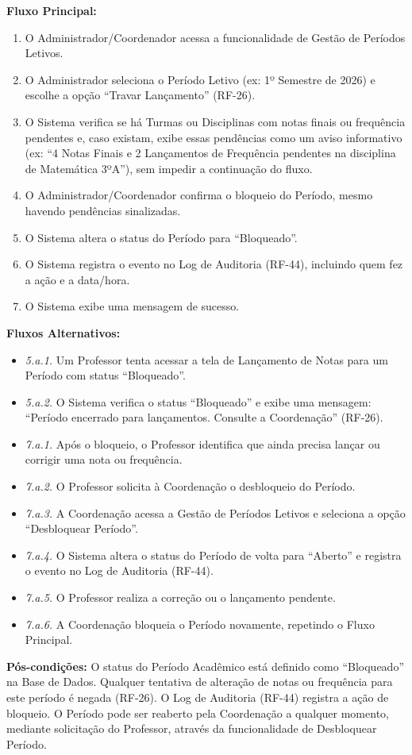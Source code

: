 \textbf{Fluxo Principal:}
\begin{enumerate}[nosep]
    \item O Administrador/Coordenador acessa a funcionalidade de Gestão de Períodos Letivos.
    \item O Administrador seleciona o Período Letivo (ex: 1º Semestre de 2026) e escolhe a opção ``Travar Lançamento'' (RF-26).
    \item O Sistema verifica se há Turmas ou Disciplinas com notas finais ou frequência pendentes e, caso existam, exibe essas pendências como um aviso informativo (ex: ``4 Notas Finais e 2 Lançamentos de Frequência pendentes na disciplina de Matemática 3ºA''), sem impedir a continuação do fluxo.
    \item O Administrador/Coordenador confirma o bloqueio do Período, mesmo havendo pendências sinalizadas.
    \item O Sistema altera o status do Período para ``Bloqueado''.
    \item O Sistema registra o evento no Log de Auditoria (RF-44), incluindo quem fez a ação e a data/hora.
    \item O Sistema exibe uma mensagem de sucesso.
\end{enumerate}

\textbf{Fluxos Alternativos:}
\begin{itemize}[nosep]
    \item \textit{5.a.1.} Um Professor tenta acessar a tela de Lançamento de Notas para um Período com status ``Bloqueado''.
    \item \textit{5.a.2.} O Sistema verifica o status ``Bloqueado'' e exibe uma mensagem: ``Período encerrado para lançamentos. Consulte a Coordenação'' (RF-26).
    \item \textit{7.a.1.} Após o bloqueio, o Professor identifica que ainda precisa lançar ou corrigir uma nota ou frequência.
    \item \textit{7.a.2.} O Professor solicita à Coordenação o desbloqueio do Período.
    \item \textit{7.a.3.} A Coordenação acessa a Gestão de Períodos Letivos e seleciona a opção ``Desbloquear Período''.
    \item \textit{7.a.4.} O Sistema altera o status do Período de volta para ``Aberto'' e registra o evento no Log de Auditoria (RF-44).
    \item \textit{7.a.5.} O Professor realiza a correção ou o lançamento pendente.
    \item \textit{7.a.6.} A Coordenação bloqueia o Período novamente, repetindo o Fluxo Principal.
\end{itemize}

\textbf{Pós-condições:} O status do Período Acadêmico está definido como
``Bloqueado'' na Base de Dados. Qualquer tentativa de alteração de notas ou
frequência para este período é negada (RF-26). O Log de Auditoria (RF-44)
registra a ação de bloqueio. O Período pode ser reaberto pela Coordenação a
qualquer momento, mediante solicitação do Professor, através da
funcionalidade de Desbloquear Período.
